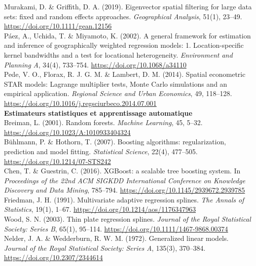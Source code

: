 \documentclass[11pt,a4paper]{article}
\begin{document}
{Murakami, D. \& Griffith, D. A. (2019). Eigenvector spatial filtering for large data sets: fixed and random effects approaches. \textit{Geographical Analysis}, 51(1), 23--49. \url{https://doi.org/10.1111/gean.12156}\\[0.2cm]

Páez, A., Uchida, T. \& Miyamoto, K. (2002). A general framework for estimation and inference of geographically weighted regression models: 1. Location-specific kernel bandwidths and a test for locational heterogeneity. \textit{Environment and Planning A}, 34(4), 733--754. \url{https://doi.org/10.1068/a34110}\\[0.2cm]

Pede, V. O., Florax, R. J. G. M. \& Lambert, D. M. (2014). Spatial econometric STAR models: Lagrange multiplier tests, Monte Carlo simulations and an empirical application. \textit{Regional Science and Urban Economics}, 49, 118--128. \url{https://doi.org/10.1016/j.regsciurbeco.2014.07.001}\\[0.4cm]

\textbf{Estimateurs statistiques et apprentissage automatique}\\[0.15cm]

Breiman, L. (2001). Random forests. \textit{Machine Learning}, 45, 5--32. \url{https://doi.org/10.1023/A:1010933404324}\\[0.2cm]

Bühlmann, P. \& Hothorn, T. (2007). Boosting algorithms: regularization, prediction and model fitting. \textit{Statistical Science}, 22(4), 477--505. \url{https://doi.org/10.1214/07-STS242}\\[0.2cm]

Chen, T. \& Guestrin, C. (2016). XGBoost: a scalable tree boosting system. In \textit{Proceedings of the 22nd ACM SIGKDD International Conference on Knowledge Discovery and Data Mining}, 785--794. \url{https://doi.org/10.1145/2939672.2939785}\\[0.2cm]

Friedman, J. H. (1991). Multivariate adaptive regression splines. \textit{The Annals of Statistics}, 19(1), 1--67. \url{https://doi.org/10.1214/aos/1176347963}\\[0.2cm]

Wood, S. N. (2003). Thin plate regression splines. \textit{Journal of the Royal Statistical Society: Series B}, 65(1), 95--114. \url{https://doi.org/10.1111/1467-9868.00374}\\[0.2cm]

Nelder, J. A. \& Wedderburn, R. W. M. (1972). Generalized linear models. \textit{Journal of the Royal Statistical Society: Series A}, 135(3), 370--384. \url{https://doi.org/10.2307/2344614}\\[0.4cm]

}
\end{document}

